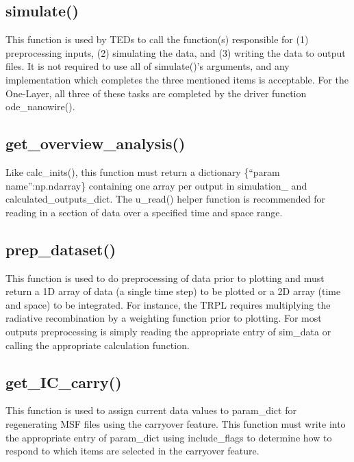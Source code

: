 \documentclass[11pt,letterpaper,titlepage]{article}
\begin{document}
		\subsection{simulate()}
		\par This function is used by TEDs to call the function(s) responsible for (1) preprocessing inputs, (2) simulating the data, and (3) writing the data to output files. It is not required to use all of simulate()’s arguments, and any implementation which completes the three mentioned items is acceptable. For the One-Layer, all three of these tasks are completed by the driver function ode\_nanowire().
		
		\subsection{get\_overview\_analysis()}
		\par Like calc\_inits(), this function must return a dictionary \{“param name”:np.ndarray\} containing one array per output in simulation\_ and calculated\_outputs\_dict. The u\_read() helper function is recommended for reading in a section of data over a specified time and space range.
		
		\subsection{prep\_dataset()}
		\par This function is used to do preprocessing of data prior to plotting and must return a 1D array of data (a single time step) to be plotted or a 2D array (time and space) to be integrated. For instance, the TRPL requires multiplying the radiative recombination by a weighting function prior to plotting. For most outputs preprocessing is simply reading the appropriate entry of sim\_data or calling the appropriate calculation function.
		
		\subsection{get\_IC\_carry()}
		\par This function is used to assign current data values to param\_dict for regenerating MSF files using the carryover feature. This function must write into the appropriate entry of param\_dict using include\_flags to determine how to respond to which items are selected in the carryover feature.
\end{document}
